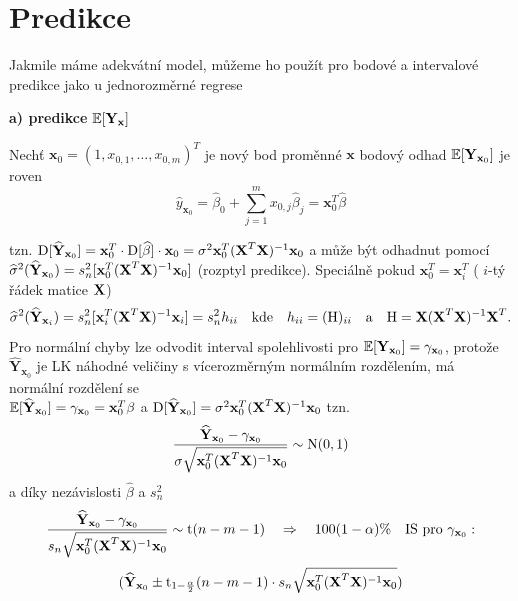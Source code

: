 \section{Predikce}
Jakmile máme adekvátní model, můžeme ho použít pro bodové a intervalové predikce jako u jednorozměrné regrese

\textbf{ a) predikce} $ \mathbb{E} [ \textbf{Y}_{\textbf{x}} ] $

Nechť $ \textbf{x}_0 = ( 1, x_{0,1} , \dots , x_{0,m} )^{T} $ je nový bod proměnné $ \textbf{x} $ bodový odhad $ \mathbb{E} [ \textbf{Y}_{\textbf{x}_0} ] $ je roven 
$$
 \widehat{y}_{\textbf{x}_0} = \widehat{\beta}_0 + \sum_{j=1}^{m} x_{0,j} \widehat{\beta}_j = \textbf{x}_0^{T} \widehat{\beta} 
$$

tzn. $ \mathrm{D} [ \widehat{\textbf{Y}}_{\textbf{x}_0} ] = \textbf{x}_0^{T} \cdot \mathrm{D} [ \widehat{\beta} ] \cdot \textbf{x}_0 = \sigma^{2} \textbf{x}_0^{T}( \textbf{X} ^{T} \textbf{X} )^{-1} \textbf{x}_0 $ a může být odhadnut pomocí \\
$
 \widehat{\sigma}^{2}(\widehat{\textbf{Y}}_{\textbf{x}_0}) = s_n^2 [ \textbf{x}_0^{T}( \textbf{X} ^{T} \textbf{X} )^{-1} \textbf{x}_0 ]  $ (rozptyl predikce). Speciálně pokud $ \textbf{x}_0^{T} = \textbf{x}_i^{T} $ ( $ i $-tý řádek matice $ \textbf{X} $)
 $$
  \widehat{\sigma}^{2}(\widehat{\textbf{Y}}_{\textbf{x}_i}) = s_n^2 [ \textbf{x}_i^{T}( \textbf{X} ^{T} \textbf{X} )^{-1} \textbf{x}_i ] = s_n^2 h_{ii} \quad \text{kde} \quad h_{ii} = (\text{H})_{ii} \quad \text{a} \quad \text{H} = \textbf{X} (\textbf{X} ^{T}  \textbf{X} )^{-1} \textbf{X} ^{T}.
 $$
Pro normální chyby lze odvodit interval spolehlivosti pro $ \mathbb{E} [\textbf{Y}_{\textbf{x}_0}] = \gamma_{\textbf{x}_0} $, protože $ \widehat{\textbf{Y}}_{\textbf{x}_0} $ je LK náhodné veličiny s vícerozměrným normálním rozdělením, má normální rozdělení se \\ $ \mathbb{E} [\widehat{\textbf{Y}}_{\textbf{x}_0}] = \gamma_{\textbf{x}_0} = \textbf{x}_0^{T} \beta $ a $ \mathrm{D} [ \widehat{\textbf{Y}}_{\textbf{x}_0} ] = \sigma^{2} \textbf{x}_0^{T}( \textbf{X} ^{T} \textbf{X} )^{-1} \textbf{x}_0 $
tzn.
$$
\frac{\widehat{\textbf{Y}}_{\textbf{x}_0} - \gamma_{\textbf{x}_0}}{\sigma \sqrt{\textbf{x}_0^{T}( \textbf{X} ^{T} \textbf{X} )^{-1} \textbf{x}_0}} \sim \text{N}(0,1) 
$$
a díky nezávislosti $ \widehat{\beta} $ a $ s_n^2 $
$$
 \frac{\widehat{\textbf{Y}}_{\textbf{x}_0} - \gamma_{\textbf{x}_0}}{s_n \sqrt{\textbf{x}_0^{T}( \textbf{X} ^{T} \textbf{X} )^{-1} \textbf{x}_0}} \sim \text{t}(n-m-1) \quad \Rightarrow \quad 100(1 - \alpha) \% \quad \text{IS pro } \gamma_{\textbf{x}_0}:
$$
$$
   ( \widehat{\textbf{Y}}_{\textbf{x}_0} \pm \text{t}_{1-\frac{\alpha}{2}}(n-m-1) \cdot s_n \sqrt{\textbf{x}_0^{T}( \textbf{X} ^{T} \textbf{X} )^{-1} \textbf{x}_0})
$$

